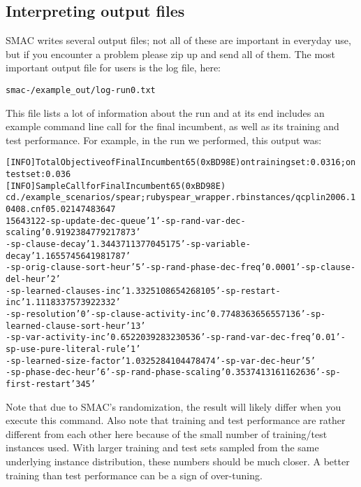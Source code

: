 \documentclass[11pt,letterpaper,twoside]{article}
\begin{document}
\subsection{Interpreting output files}

SMAC writes several output files; not all of these are important in everyday use, but if you encounter a problem please zip up and send all of them. The most important output file for users is the log file, here:

{\footnotesize
\begin{alltt}
{smac-\version{}\unskip/example_out/log-run0.txt}
\end{alltt}}
This file lists a lot of information about the run and at its end includes an example command line call for the final incumbent, as well as its training and test performance. For example, in the run we performed, this output was:

{\footnotesize
\begin{alltt}
[INFO ] Total Objective of Final Incumbent 65 (0xBD98E) on training set: 0.0316; on test set: 0.036
[INFO ] Sample Call for Final Incumbent 65 (0xBD98E) 
cd ./example_scenarios/spear; ruby spear_wrapper.rb instances/qcplin2006.10408.cnf 0 5.0 2147483647
15643122 -sp-update-dec-queue '1' -sp-rand-var-dec-scaling '0.9192384779217873' 
-sp-clause-decay '1.3443711377045175' -sp-variable-decay '1.1655745641981787'
-sp-orig-clause-sort-heur '5' -sp-rand-phase-dec-freq '0.0001' -sp-clause-del-heur '2'
-sp-learned-clauses-inc '1.3325108654268105' -sp-restart-inc '1.1118337573922332' 
-sp-resolution '0' -sp-clause-activity-inc '0.7748363656557136' -sp-learned-clause-sort-heur '13'
-sp-var-activity-inc '0.6522039283230536' -sp-rand-var-dec-freq '0.01' -sp-use-pure-literal-rule '1'
-sp-learned-size-factor '1.0325284104478474' -sp-var-dec-heur '5'
-sp-phase-dec-heur '6' -sp-rand-phase-scaling '0.3537413161162636' -sp-first-restart '345'  
\end{alltt}
}

Note that due to SMAC's randomization, the result will likely differ when you execute this command.
Also note that training and test performance are rather different from each other here because of the small 
number of training/test instances used. With larger training and test sets sampled from the same underlying instance distribution,
these numbers should be much closer. A better training than test performance can be a sign of over-tuning.
\end{document}

